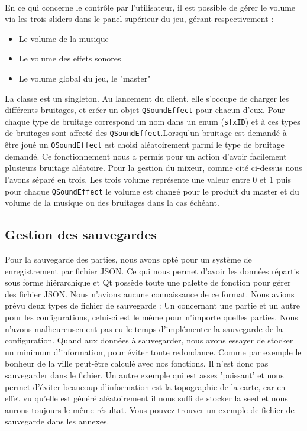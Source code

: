 \documentclass[a4paper,10pt,openany,oneside]{report}
\begin{document}
\paragraph{}
En ce qui concerne le contrôle par l'utilisateur, il est possible de gérer le volume via les trois sliders dans le panel supérieur du jeu, gérant respectivement :
\begin{itemize}
\item Le volume de la musique
\item Le volume des effets sonores
\item Le volume global du jeu, le "master"
\end{itemize}
La classe est un singleton. Au lancement du client, elle s'occupe de charger les différents bruitages, et créer un objet \texttt{QSoundEffect} pour chacun d'eux. Pour chaque type de bruitage correspond un nom dans un enum (\texttt{sfxID}) et à ces types de bruitages sont affecté des \texttt{QSoundEffect}.Lorsqu'un bruitage est demandé à être joué un \texttt{QSoundEffect} est choisi aléatoirement parmi le type de bruitage demandé. Ce fonctionnement nous a permis pour un action d'avoir facilement plusieurs bruitage aléatoire.
\newline
Pour la gestion du mixeur, comme cité ci-dessus nous l'avons séparé en trois. Les trois volume représente une valeur entre 0 et 1 puis pour chaque \texttt{QSoundEffect} le volume est changé pour le produit du master et du volume de la musique ou des bruitages dans la cas échéant.
\subsection{Gestion des sauvegardes}
Pour la sauvegarde des parties, nous avons opté pour un système de enregistrement par fichier JSON. Ce qui nous permet d'avoir les données répartis sous forme hiérarchique et Qt possède toute une palette de fonction pour gérer des fichier JSON. Nous n'avions aucune connaissance de ce format.
\newline
Nous avions prévu deux types de fichier de sauvegarde : Un concernant une partie et un autre pour les configurations, celui-ci est le même pour n'importe quelles parties. Nous n'avons malheureusement pas eu le temps d'implémenter la sauvegarde de la configuration.
\newline
Quand aux données à sauvegarder, nous avons essayer de stocker un minimum d'information, pour éviter toute redondance. Comme par exemple le bonheur de la ville peut-être calculé avec nos fonctions. Il n'est donc pas sauvegarder dans le fichier. Un autre exemple qui est assez 'puissant' et nous permet d'éviter beaucoup d'information est la topographie de la carte, car en effet vu qu'elle est généré aléatoirement il nous suffi de stocker la seed et nous aurons toujours le même résultat.
\newline
Vous pouvez trouver un exemple de fichier de sauvegarde dans les annexes.
\end{document}
